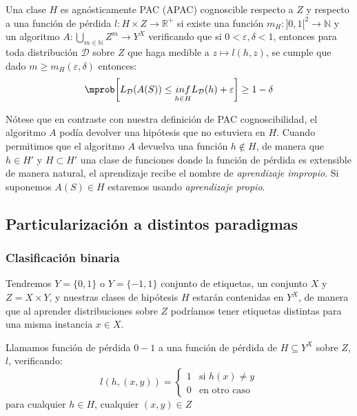 \begin{definition}
Una clase $H$ es agnósticamente PAC (APAC) cognoscible respecto a $Z$ y respecto a una función de pérdida 
$l: H \times Z \rightarrow \mathbb{R}^{+}$ si existe una función 
$m_{H} : ]0,1[^2\rightarrow \mathbb{N}$ y un algoritmo 
$A: \underset{m\in \mathbb{N}}{\bigcup} Z^m \rightarrow Y^X$ verificando que si 
$0 < \varepsilon, \delta < 1$, entonces para toda distribución $\mathcal{D}$ sobre $Z$ que haga medible a $z \mapsto l(h, z)$,
se cumple que dado $m\ge m_{H}(\varepsilon, \delta)$ entonces:
\[\mprob \bigg[L_{\mathcal{D}}(A(S)) \le \underset{h\in H}{inf} L_{\mathcal{D}}(h) + \varepsilon \bigg] \ge 1-\delta\]
\end{definition}

Nótese que en contraste con nuestra definición de PAC cognoscibilidad, el algoritmo $A$ podía devolver una 
hipótesis que no estuviera en $H$. Cuando permitimos que el algoritmo $A$ devuelva una función 
$h \notin H$, de manera que $h \in H'$ y  $H \subset H'$ una clase de funciones donde la función de pérdida 
es extensible de manera natural, el aprendizaje recibe el nombre de \textit{aprendizaje impropio}. Si suponemos
$A(S) \in H$ estaremos usando \textit{aprendizaje propio}.

\subsection{Particularización a distintos paradigmas}

\subsubsection{Clasificación binaria}
\label{sec:clas-binaria}

Tendremos $Y=\{0,1\}$ o $Y=\{-1,1\}$ conjunto de etiquetas, un conjunto $X$ y $Z=X\times Y$, y nuestras clases
de hipótesis $H$ estarán contenidas en $Y^X$, de manera que al aprender distribuciones sobre $Z$ podríamos 
tener etiquetas distintas para una misma instancia $x \in X$.

\begin{definition}
Llamamos función de pérdida $0-1$ a una función de pérdida de $H\subseteq Y^X$ sobre $Z$, $l$, verificando:
\[
  l(h, (x,y)) = \left\{\begin{array}{ll}
                        1 & \textrm{si } h(x)\neq y\\
                        0 & \textrm{en otro caso}
                        \end{array}\right.
\]
para cualquier $h\in H$, cualquier $(x,y) \in Z$
\label{def:zero-one-loss}
\end{definition}

